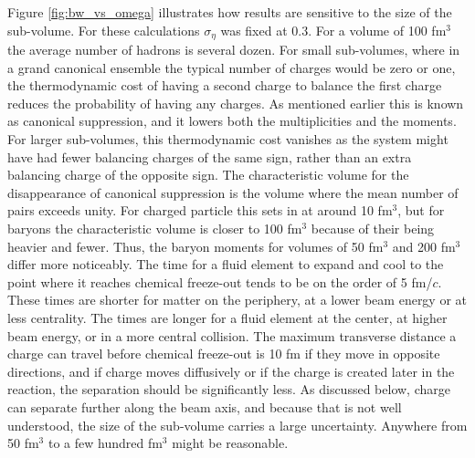 Figure \ref{fig:bw_vs_omega} illustrates how results are sensitive to the size of the sub-volume. For these calculations $\sigma_\eta$ was fixed at 0.3. For a volume of 100 fm$^3$ the average number of hadrons is several dozen. For small sub-volumes, where in a grand canonical ensemble the typical number of charges would be zero or one, the thermodynamic cost of having a second charge to balance the first charge reduces the probability of having any charges. As mentioned earlier this is known as canonical suppression, and it lowers both the multiplicities and the moments. For larger sub-volumes, this thermodynamic cost vanishes as the system might have had fewer balancing charges of the same sign, rather than an extra balancing charge of the opposite sign. The characteristic volume for the disappearance of canonical suppression is the volume where the mean number of pairs exceeds unity. For charged particle this sets in at around 10 fm$^3$, but for baryons the characteristic volume is closer to 100 fm$^3$ because of their being heavier and fewer. Thus, the baryon moments for volumes of 50 fm$^3$ and 200 fm$^3$ differ more noticeably. The time for a fluid element to expand and cool to the point where it reaches chemical freeze-out tends to be on the order of 5 fm/$c$. These times are shorter for matter on the periphery, at a lower beam energy or at less centrality. The times are longer for a fluid element at the center, at higher beam energy, or in a more central collision. The maximum transverse distance a charge can travel before chemical freeze-out is 10 fm if they move in opposite directions, and if charge moves diffusively or if the charge is created later in the reaction, the separation should be significantly less. As discussed below, charge can separate further along the beam axis, and because that is not well understood, the size of the sub-volume carries a large uncertainty. Anywhere from 50 fm$^3$ to a few hundred fm$^3$ might be reasonable. 

